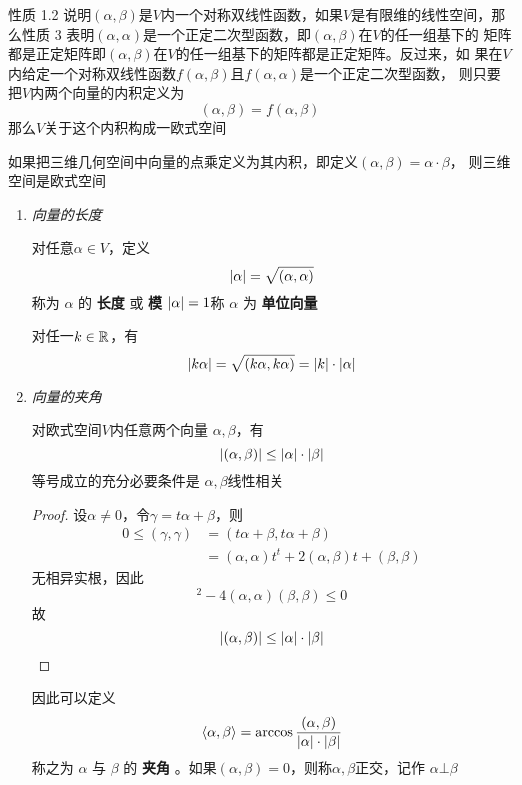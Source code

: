 \documentclass[11pt]{article}
\begin{document}
性质 1.2 说明\((\alpha,\beta)\)是\(V\)内一个对称双线性函数，如果\(V\)是有限维的线性空间，那
么性质 3 表明\((\alpha,\alpha)\)是一个正定二次型函数，即\((\alpha,\beta)\)在\(V\)的任一组基下的
矩阵都是正定矩阵即\((\alpha,\beta)\)在\(V\)的任一组基下的矩阵都是正定矩阵。反过来，如
果在\(V\)内给定一个对称双线性函数\(f(\alpha,\beta)\)且\(f(\alpha,\alpha)\)是一个正定二次型函数，
则只要把\(V\)内两个向量的内积定义为
\begin{equation*}
(\alpha,\beta)=f(\alpha,\beta)
\end{equation*}
那么\(V\)关于这个内积构成一欧式空间

如果把三维几何空间中向量的点乘定义为其内积，即定义\((\alpha,\beta)=\alpha\cdot\beta\)，
则三维空间是欧式空间

\begin{enumerate}
\item \emph{向量的长度}

对任意\(\alpha\in V\)，定义
\begin{equation*}
\abs{\alpha}=\sqrt{(\alpha,\alpha)}
\end{equation*}
称为 \(\alpha\) 的 \textbf{长度} 或 \textbf{模} \(\abs{\alpha}=1\)称 \(\alpha\) 为 \textbf{单位向量}

对任一\(k\in\mathbb{R}\)，有
\begin{equation*}
\abs{k\alpha}=\sqrt{(k\alpha,k\alpha)}=\abs{k}\cdot\abs{\alpha}
\end{equation*}

\item \emph{向量的夹角}

\begin{proposition}[柯西-施瓦茨不等式]
对欧式空间\(V\)内任意两个向量 \(\alpha,\beta\)，有
\begin{equation*}
\abs{(\alpha,\beta)}\le\abs{\alpha}\cdot\abs{\beta}
\end{equation*}
等号成立的充分必要条件是 \(\alpha,\beta\)线性相关
\end{proposition}

\begin{proof}
设\(\alpha\neq0\)，令\(\gamma=t\alpha+\beta\)，则
\begin{align*}
0\le(\gamma,\gamma)&=(t\alpha+\beta,t\alpha+\beta)\\
&=(\alpha,\alpha)t^t+2(\alpha,\beta)t+(\beta,\beta)
\end{align*}
无相异实根，因此
\begin{equation*}
[2(\alpha,\beta)]^2-4(\alpha,\alpha)(\beta,\beta)\le0
\end{equation*}
故
\begin{equation*}
\abs{(\alpha,\beta)}\le\abs{\alpha}\cdot\abs{\beta}
\end{equation*}
\end{proof}
因此可以定义
\begin{equation*}
\la\alpha,\beta\ra=\arccos\frac{(\alpha,\beta)}{\abs{\alpha}\cdot\abs{\beta}}
\end{equation*}
称之为 \(\alpha\) 与 \(\beta\) 的 \textbf{夹角} 。如果\((\alpha,\beta)=0\)，则称\(\alpha,\beta\)正交，记作
\(\alpha\bot\beta\)
\end{enumerate}
\end{document}
